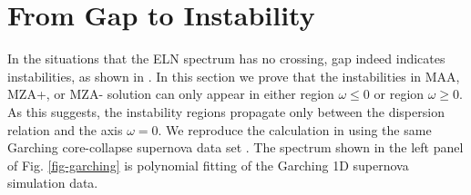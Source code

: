 \documentclass[%
preprint,
 amsmath,amssymb,
 aps,
 prd
]{revtex4-1}
\begin{document}
\section{\label{sec-gap-to-instability}From Gap to Instability}

In the situations that the ELN spectrum has no crossing, gap indeed indicates instabilities, as shown in . In this section we prove that the instabilities in MAA, MZA+, or MZA- solution can only appear in either region $\omega\leq 0$ or region $\omega \geq 0$. As this suggests, the instability regions propagate only between the dispersion relation and the axis $\omega=0$. We reproduce the calculation in  using the same Garching core-collapse supernova data set \cite{garching-ccsn-data}. The spectrum shown in the left panel of Fig. \ref{fig-garching} is polynomial fitting of the Garching 1D supernova simulation data.
\end{document}
